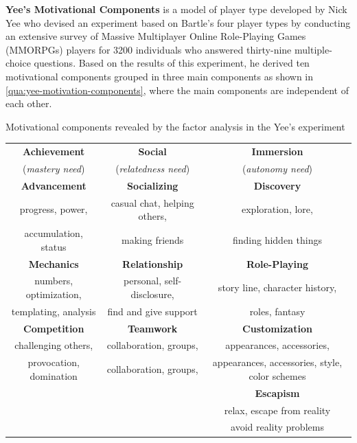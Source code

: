 \textbf{Yee's Motivational Components} \cite{Yee2006, Yee2006a} is a model of player type developed by Nick Yee who devised an experiment based on Bartle's four player types by conducting an extensive survey of Massive Multiplayer Online Role-Playing Games (MMORPGs) players for 3200 individuals who answered thirty-nine multiple-choice questions.
Based on the results of this experiment, he derived ten motivational components grouped in three main components as shown in \autoref{qua:yee-motivation-components}, where the main components are independent of each other. 

\begin{quadro}[htb]
\caption{Motivational components revealed by the factor analysis in the Yee's experiment}
\label{qua:yee-motivation-components}
\centering
\scriptsize
\begin{tabular}{|c|c|c|} \hline
\textbf{Achievement} & \textbf{Social} & \textbf{Immersion} \\
(\emph{mastery need}) & (\emph{relatedness need}) & (\emph{autonomy need}) \\ \hline \hline
\textbf{Advancement} & \textbf{Socializing} & \textbf{Discovery} \\
progress, power,  & casual chat, helping others, & exploration, lore, \\
accumulation, status & making friends & finding hidden things \\ \hline
\textbf{Mechanics} & \textbf{Relationship} & \textbf{Role-Playing} \\
numbers, optimization, & personal, self-disclosure, & story line, character history, \\
templating, analysis & find and give support & roles, fantasy \\ \hline
\textbf{Competition} & \textbf{Teamwork} & \textbf{Customization} \\
challenging others, & collaboration, groups, & appearances, accessories, \\
provocation, domination & collaboration, groups, & appearances, accessories, style, color schemes \\ \hline
& & \textbf{Escapism} \\
& & relax, escape from reality \\ 
& & avoid reality problems \\ \hline
\end{tabular}
\end{quadro}

